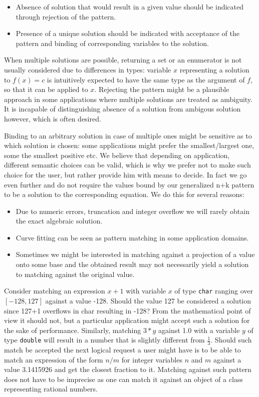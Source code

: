 \documentclass[preprint]{sigplanconf}
\makeatletter
\DeclareRobustCommand{\code}[1]{{\lstinline[breaklines=false,escapechar=@]{#1}}}
\makeatother
\begin{document}
\begin{itemize}
\setlength{\itemsep}{0pt}
\setlength{\parskip}{0pt}
\item Absence of solution that would result in a given value should be indicated 
      through rejection of the pattern.
\item Presence of a unique solution should be indicated with acceptance of the 
      pattern and binding of corresponding variables to the solution.
\end{itemize}

\noindent When multiple solutions are possible, returning a set or an enumerator 
is not usually considered due to differences in types: variable $x$ representing 
a solution to $f(x)=c$ is intuitively expected to have the same type as the 
argument of $f$, so that it can be applied to $x$. Rejecting the pattern might be 
a plausible approach in some applications where multiple solutions are treated as 
ambiguity. It is incapable of distinguishing absence of a solution from ambigous 
solution however, which is often desired.

Binding to an arbitrary solution in case of multiple ones might be sensitive as 
to which solution is chosen: some applications might prefer the 
smallest/largest one, some the smallest positive etc.
We believe that depending on application, different semantic choices can be 
valid, which is why we prefer not to make such choice for the user, but rather 
provide him with means to decide. In fact we go even further and do not require 
the values bound by our generalized n+k pattern to be a solution to the 
corresponding equation. We do this for several reasons:

\begin{itemize}
\item Due to numeric errors, truncation and integer overflow we will rarely 
      obtain the exact algebraic solution.
\item Curve fitting can be seen as pattern matching in some application domains. 
\item Sometimes we might be interested in matching against a projection of a 
      value onto some base and the obtained result may not necessarily yield a 
      solution to matching against the original value.
\end{itemize}

Consider matching an expression $x+1$ with variable $x$ of type \code{char} 
ranging over $[-128,127]$ against a value -128. Should the value 127 be 
considered a solution since 127+1 overflows in char resulting in -128? From the 
mathematical point of view it should not, but a particular application might 
accept such a solution for the sake of performance. Similarly, matching $3*y$ 
against 1.0 with a variable $y$ of type \code{double} will result in a number 
that is slightly different from $\frac{1}{3}$. Should such match be accepted the 
next logical request a user might have is to be able to match an expression of 
the form $n/m$ for integer variables $n$ and $m$ against a value 3.1415926 and 
get the closest fraction to it. Matching against such pattern does not have to 
be imprecise as one can match it against an object of a class representing 
rational numbers.
\end{document}
